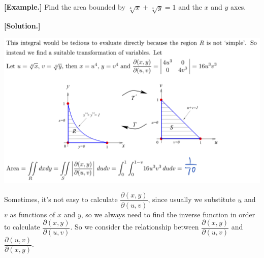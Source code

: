 \documentclass[11pt, a4paper]{MATH2023}
\newcommand{\eg}{\textbf{[Example.] }}
\newcommand{\sol}{\textbf{[Solution.] }}
\begin{document}
\begin{spacing}{1.3}
    \newpage
    \eg Find the area bounded by $\sqrt[4]{x}+\sqrt[4]{y}=1$ and the $x$ and $y$ axes.

    \sol

    \includegraphics[scale=0.24]{images/Ch14-jacobian-eg2.jpeg}

    \vspace{0.2in}
    Sometimes, it's not easy to calculate $\dfrac{\partial(x, y)}{\partial(u, v)}$, 
    since usually we substitute $u$ and $v$ as functions of $x$ and $y$, so we always need to find the inverse 
    function in order to calculate $\dfrac{\partial(x, y)}{\partial(u, v)}$. So we consider the relationship 
    between  $\dfrac{\partial(x, y)}{\partial(u, v)}$ and $\dfrac{\partial(u, v)}{\partial(x, y)}$.


\end{spacing}
\end{document}

